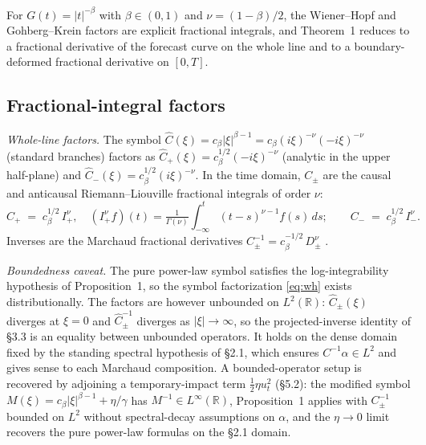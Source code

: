 \documentclass[11pt]{article}
\newcommand{\R}{\mathbb{R}}
\theoremstyle{plain}
\begin{document}
For $G(t) = |t|^{-\beta}$ with $\beta\in(0,1)$ and $\nu = (1-\beta)/2$, the Wiener--Hopf and Gohberg--Krein factors are explicit fractional integrals, and Theorem~1 reduces to a fractional derivative of the forecast curve on the whole line and to a boundary-deformed fractional derivative on $[0,T]$.

\subsection{Fractional-integral factors}

\emph{Whole-line factors.} The symbol $\hat C(\xi) = c_\beta|\xi|^{\beta-1} = c_\beta(i\xi)^{-\nu}(-i\xi)^{-\nu}$ (standard branches) factors as $\hat C_+(\xi) = c_\beta^{1/2}(-i\xi)^{-\nu}$ (analytic in the upper half-plane) and $\hat C_-(\xi) = c_\beta^{1/2}(i\xi)^{-\nu}$. In the time domain, $C_\pm$ are the causal and anticausal Riemann--Liouville fractional integrals of order $\nu$:
\begin{equation}\label{eq:marchaud-wh}
C_+ \;=\; c_\beta^{1/2}\,I_+^\nu, \quad (I_+^\nu f)(t) = \tfrac{1}{\Gamma(\nu)}\!\int_{-\infty}^{t}(t-s)^{\nu-1}f(s)\,ds; \qquad C_- \;=\; c_\beta^{1/2}\,I_-^\nu.
\end{equation}
Inverses are the Marchaud fractional derivatives $C_\pm^{-1} = c_\beta^{-1/2}\,D_\pm^\nu$ \citep[\S5.4]{SamkoKilbasMarichev1993}.

\emph{Boundedness caveat.} The pure power-law symbol satisfies the log-integrability hypothesis of Proposition~1, so the symbol factorization \eqref{eq:wh} exists distributionally. The factors are however unbounded on $L^2(\R)$: $\hat C_\pm(\xi)$ diverges at $\xi=0$ and $\hat C_\pm^{-1}$ diverges as $|\xi|\to\infty$, so the projected-inverse identity of \S3.3 is an equality between unbounded operators. It holds on the dense domain fixed by the standing spectral hypothesis of \S2.1, which ensures $C^{-1}\alpha\in L^2$ and gives sense to each Marchaud composition. A bounded-operator setup is recovered by adjoining a temporary-impact term $\tfrac12\eta u_t^2$ (\S5.2): the modified symbol $M(\xi) = c_\beta|\xi|^{\beta-1}+\eta/\gamma$ has $M^{-1}\in L^\infty(\R)$, Proposition~1 applies with $C_\pm^{-1}$ bounded on $L^2$ without spectral-decay assumptions on $\alpha$, and the $\eta\to 0$ limit recovers the pure power-law formulas on the \S2.1 domain.
\end{document}
